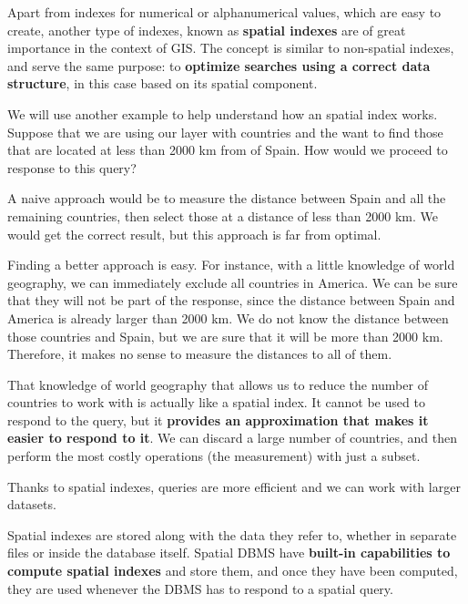 Apart from indexes for numerical or alphanumerical values, which are easy to create, another type of indexes, known as \textbf{spatial indexes} are of great importance in the context of GIS. The concept is similar to non-spatial indexes, and serve the same purpose: to \textbf{optimize searches using a correct data structure}, in this case based on its spatial component.

We will use another example to help understand how an spatial index works. Suppose that we are using our layer with countries and the want to find those that are located at less than 2000 km from of Spain. How would we proceed to response to this query? 

A naive approach would be to measure the distance between Spain and all the remaining countries, then select those at a distance of less than 2000 km. We would get the correct result, but this approach is far from optimal. 

Finding a better approach is easy. For instance, with a little knowledge of world geography, we can immediately exclude all countries in America. We can be sure that they will not be part of the response, since the distance between Spain and America is already larger than 2000 km. We do not know the distance between those countries and Spain, but we are sure that it will be more than 2000 km. Therefore, it makes no sense to measure the distances to all of them.

That knowledge of world geography that allows us to reduce the number of countries to work with is actually like a spatial index. It cannot be used to respond to the query, but it \textbf{provides an approximation that makes it easier to respond to it}. We can discard a large number of countries, and then perform the most costly operations (the measurement) with just a subset.

Thanks to spatial indexes, queries are more efficient and we can work with larger datasets.

Spatial indexes are stored along with the data they refer to, whether in separate files or inside the database itself. Spatial DBMS have \textbf{built-in capabilities to compute spatial indexes} and store them, and once they have been computed, they are used whenever the DBMS has to respond to a spatial query.


\pagestyle{empty}
